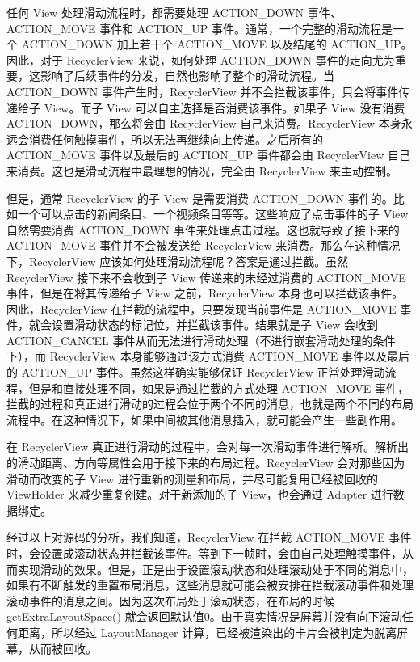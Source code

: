 任何 View 处理滑动流程时，都需要处理 ACTION\_DOWN 事件、ACTION\_MOVE 事件和 ACTION\_UP 事件。通常，一个完整的滑动流程是一个 ACTION\_DOWN 加上若干个 ACTION\_MOVE 以及结尾的 ACTION\_UP。因此，对于 RecyclerView 来说，如何处理 ACTION\_DOWN 事件的走向尤为重要，这影响了后续事件的分发，自然也影响了整个的滑动流程。当 ACTION\_DOWN 事件产生时，RecyclerView 并不会拦截该事件，只会将事件传递给子 View。而子 View 可以自主选择是否消费该事件。如果子 View 没有消费 ACTION\_DOWN，那么将会由 RecyclerView 自己来消费。RecyclerView 本身永远会消费任何触摸事件，所以无法再继续向上传递。之后所有的 ACTION\_MOVE 事件以及最后的 ACTION\_UP 事件都会由 RecyclerView 自己来消费。这也是滑动流程中最理想的情况，完全由 RecyclerView 来主动控制。

但是，通常 RecyclerView 的子 View 是需要消费 ACTION\_DOWN 事件的。比如一个可以点击的新闻条目、一个视频条目等等。这些响应了点击事件的子 View 自然需要消费 ACTION\_DOWN 事件来处理点击过程。这也就导致了接下来的 ACTION\_MOVE 事件并不会被发送给 RecyclerView 来消费。那么在这种情况下，RecyclerView 应该如何处理滑动流程呢？答案是通过拦截。虽然 RecyclerView 接下来不会收到子 View 传递来的未经过消费的 ACTION\_MOVE 事件，但是在将其传递给子 View 之前，RecyclerView 本身也可以拦截该事件。因此，RecyclerView 在拦截的流程中，只要发现当前事件是 ACTION\_MOVE 事件，就会设置滑动状态的标记位，并拦截该事件。结果就是子 View 会收到 ACTION\_CANCEL 事件从而无法进行滑动处理（不进行嵌套滑动处理的条件下），而 RecyclerView 本身能够通过该方式消费 ACTION\_MOVE 事件以及最后的 ACTION\_UP 事件。虽然这样确实能够保证 RecyclerView 正常处理滑动流程，但是和直接处理不同，如果是通过拦截的方式处理 ACTION\_MOVE 事件，拦截的过程和真正进行滑动的过程会位于两个不同的消息，也就是两个不同的布局流程中。在这种情况下，如果中间被其他消息插入，就可能会产生一些副作用。

在 RecyclerView 真正进行滑动的过程中，会对每一次滑动事件进行解析。解析出的滑动距离、方向等属性会用于接下来的布局过程。RecyclerView 会对那些因为滑动而改变的子 View 进行重新的测量和布局，并尽可能复用已经被回收的 ViewHolder 来减少重复创建。对于新添加的子 View，也会通过 Adapter 进行数据绑定。

经过以上对源码的分析，我们知道，RecyclerView 在拦截 ACTION\_MOVE 事件时，会设置成滚动状态并拦截该事件。等到下一帧时，会由自己处理触摸事件，从而实现滑动的效果。但是，正是由于设置滚动状态和处理滚动处于不同的消息中，如果有不断触发的重置布局消息，这些消息就可能会被安排在拦截滚动事件和处理滚动事件的消息之间。因为这次布局处于滚动状态，在布局的时候 getExtraLayoutSpace() 就会返回默认值0。由于真实情况是屏幕并没有向下滚动任何距离，所以经过 LayoutManager 计算，已经被渲染出的卡片会被判定为脱离屏幕，从而被回收。

